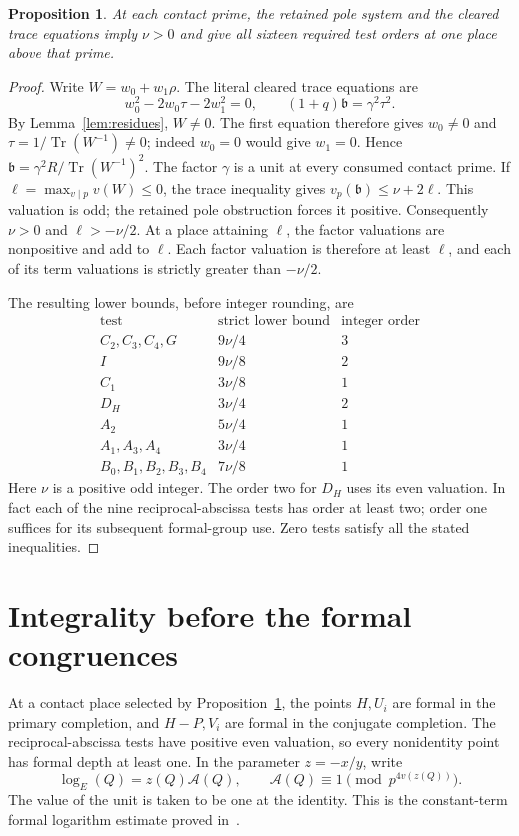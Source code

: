 \documentclass[11pt,a4paper]{article}
\newtheorem{proposition}[theorem]{Proposition}
\DeclareMathOperator{\Tr}{Tr}\DeclareMathOperator{\Nm}{Nm}
\begin{document}
\begin{proposition}\label{prop:extract}
At each contact prime, the retained pole system and the cleared trace
equations imply $\nu>0$ and give all sixteen required test orders at
one place above that prime.
\end{proposition}
\begin{proof}
Write $W=w_0+w_1\rho$. The literal cleared trace equations are
\[
 w_0^2-2w_0\tau-2w_1^2=0,\qquad (1+q)\mathfrak b=\gamma^2\tau^2.
\]
By Lemma~\ref{lem:residues}, $W\ne0$. The first equation therefore
gives $w_0\ne0$ and $\tau=1/\Tr(W^{-1})\ne0$; indeed $w_0=0$
would give $w_1=0$. Hence
$\mathfrak b=\gamma^2R/\Tr(W^{-1})^2$. The factor $\gamma$ is a unit at every consumed contact prime. If
$\ell=\max_{v\mid p}v(W)\le0$, the trace inequality gives
$v_p(\mathfrak b)\le\nu+2\ell$.
This valuation is odd; the retained pole obstruction forces it positive.
Consequently $\nu>0$ and $\ell>-\nu/2$.
At a place attaining $\ell$, the factor valuations are nonpositive
and add to $\ell$. Each factor valuation is therefore at least $\ell$,
and each of its term valuations is strictly greater than $-\nu/2$.

The resulting lower bounds, before integer rounding, are
\[
\begin{array}{c|c|c}
\text{test}&\text{strict lower bound}&\text{integer order}\\\hline
C_2,C_3,C_4,G&9\nu/4&3\\
I&9\nu/8&2\\
C_1&3\nu/8&1\\
D_H&3\nu/4&2\\
A_2&5\nu/4&1\\
A_1,A_3,A_4&3\nu/4&1\\
B_0,B_1,B_2,B_3,B_4&7\nu/8&1
\end{array}
\]
Here $\nu$ is a positive odd integer. The order two for $D_H$ uses
its even valuation. In fact each of the nine reciprocal-abscissa
tests has order at least two; order one suffices for its subsequent
formal-group use. Zero tests satisfy all the stated inequalities.
\end{proof}

\section{Integrality before the formal congruences}
At a contact place selected by Proposition~\ref{prop:extract}, the
points $H,U_i$ are formal in the primary completion, and $H-P,V_i$
are formal in the conjugate completion. The reciprocal-abscissa
tests have positive even valuation, so every nonidentity point has
formal depth at least one. In the parameter $z=-x/y$, write
\[
 \log_E(Q)=z(Q)\mathcal A(Q),\qquad
 \mathcal A(Q)\equiv1\pmod{p^{4v(z(Q))}}.
\]
The value of the unit is taken to be one at the identity. This is
the constant-term formal logarithm estimate proved in~\cite{Logs}.
\end{document}
